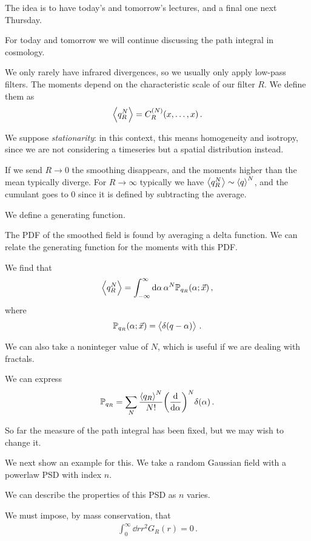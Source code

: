 \documentclass[main.tex]{subfiles}
\begin{document}

The idea is to have today's and tomorrow's lectures, and a final one next Thursday. 

For today and tomorrow we will continue discussing the path integral in cosmology. 

We only rarely have infrared divergences, so we usually only apply low-pass filters. 
The moments depend on the characteristic scale of our filter \(R\). We define them as 
%
\begin{align}
\expval{q_R^N} = C_R^{(N)} (x, \dots, x)
\,.
\end{align}

We suppose \emph{stationarity}: in this context, this means homogeneity and isotropy, since we are not considering a timeseries but a spatial distribution instead. 

If we send \(R \to 0\) the smoothing disappears, and the moments higher than the mean typically diverge. 
For \(R \to \infty \) typically we have \(\expval{q_R^N} \sim \expval{q}^{N}\), and the cumulant goes to 0 since it is defined by subtracting the average.

We define a generating function. 

The PDF of the smoothed field is found by averaging a delta function. We can relate the generating function for the moments with this PDF. 

We find that 
%
\begin{align}
\expval{q_R^N} = \int_{- \infty }^{ \infty } \dd{\alpha } \alpha^{N} \mathbb{P}_{q_R} (\alpha ; \vec{x})
\,,
\end{align}
%
where 
%
\begin{align}
\mathbb{P}_{q_R} (\alpha ; \vec{x}) = \expval{ \delta (q-\alpha )}
\,.
\end{align}

We can also take a noninteger value of \(N\), which is useful if we are dealing with fractals. 

We can express 
%
\begin{align}
\mathbb{P}_{q_R} = \sum _{N} \frac{ \expval{q_R}^{N}}{N!} \qty( \dv{}{\alpha })^{N} \delta (\alpha )
\,.
\end{align}

So far the measure of the path integral has been fixed, but we may wish to change it. 

We next show an example for this. We take a random Gaussian field with a powerlaw PSD with index \(n\). 

We can describe the properties of this PSD as \(n\) varies. 

We must impose, by mass conservation, that 
%
\begin{align}
\int_{0}^{ \infty } \dd{r} r^2 G_R(r) =  0
\,.
\end{align}
\end{document}
